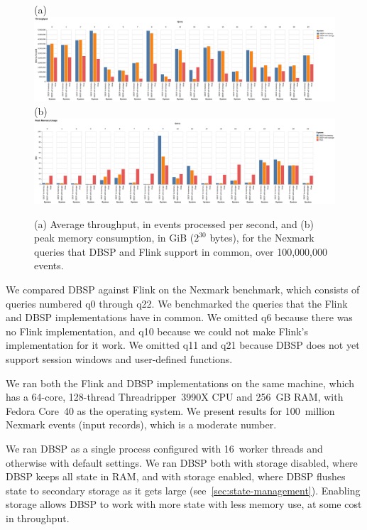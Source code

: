 \begin{figure}
  (a) \includegraphics[width=.95\textwidth]{graph/throughput} \\
  (b) \includegraphics[width=.95\textwidth]{graph/memory} \\
  \caption{(a) Average throughput, in events processed per second, and
    (b) peak memory consumption, in GiB (\(2^{30}\) bytes), for the
    Nexmark queries that DBSP and Flink support in common, over
    100,000,000 events.\label{fig:macrobenchmark}}
\end{figure}

\newcommand{\query}[1]{\textsf{#1}}

We compared DBSP against Flink on the Nexmark benchmark, which
consists of queries numbered \query{q0} through \query{q22}.  We
benchmarked the queries that the Flink and DBSP implementations
have in common.  We omitted \query{q6} because there was no Flink
implementation, and \query{q10} because we could not make Flink's
implementation for it work.  We omitted \query{q11} and \query{q21}
because DBSP does not yet support session windows and user-defined
functions.

We ran both the Flink and DBSP implementations on the same machine,
which has a 64-core, 128-thread Threadripper~3990X CPU and 256~GB RAM,
with Fedora Core~40 as the operating system. We present results for
100~million Nexmark events (input records), which is a moderate
number.

We ran DBSP as a single process configured with 16~worker threads and
otherwise with default settings.  We ran DBSP both with storage
disabled, where DBSP keeps all state in RAM, and with storage enabled,
where DBSP flushes state to secondary storage as it gets large
(see~\ref{sec:state-management}).  Enabling storage allows DBSP to
work with more state with less memory use, at some cost in throughput.

